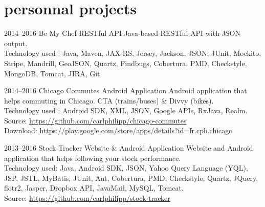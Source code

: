\documentclass[]{friggeri-cv} %
\begin{document}

\section{personnal projects}

\begin{entrylist}

\entry
{2014--2016}
{Be My Chef}
{RESTful API}
{}
{Java-based RESTful API with JSON output.\\
Technology used : Java, Maven, JAX-RS, Jersey, Jackson, JSON, JUnit, Mockito, Stripe, Mandrill, GeoJSON, Quartz, Findbugs, Cobertura, PMD, Checkstyle, MongoDB, Tomcat, JIRA, Git.}

\end{entrylist}

\begin{entrylist}

\entry
{2014--2016}
{Chicago Commutes}
{Android Application}
{}
{Android application that helps commuting in Chicago. CTA (trains/buses) \& Divvy (bikes).\\
Technology used : Android SDK, XML, JSON, Google APIs, RxJava, Realm.\\
\footnotesize{Source: \href{https://github.com/carlphilipp/chicago-commutes}{https://github.com/carlphilipp/chicago-commutes}}\\
\footnotesize{Download: \href{https://play.google.com/store/apps/details?id=fr.cph.chicago}{https://play.google.com/store/apps/details?id=fr.cph.chicago}}}

\end{entrylist}

\begin{entrylist}

\entry
{2013--2016}
{Stock Tracker}
{Website \& Android Application}
{}
{Website and Android application that helps following your stock performance.\\
Technology used: Java, Android SDK, JSON, Yahoo Query Language (YQL), JSP, JSTL, MyBatis,
JUnit, Ant, Cobertura, PMD, Checkstyle, Quartz, JQuery, flotr2, Jasper, Dropbox API, JavaMail,
MySQL, Tomcat.\\
\footnotesize{Source: \href{https://github.com/carlphilipp/stock-tracker}{https://github.com/carlphilipp/stock-tracker}}}

\end{entrylist}
\end{document}
